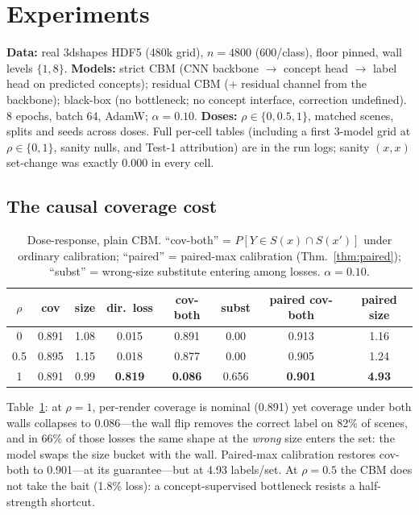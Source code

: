 \documentclass[11pt]{article}
\begin{document}
\section{Experiments}
\label{sec:experiments}

\textbf{Data:} real 3dshapes HDF5 (480k grid), $n=4800$ (600/class), floor
pinned, wall levels $\{1,8\}$. \textbf{Models:} strict CBM (CNN backbone
$\to$ concept head $\to$ label head on predicted concepts); residual CBM
(+ residual channel from the backbone); black-box (no bottleneck; no concept
interface, correction undefined). 8 epochs, batch 64, AdamW; $\alpha=0.10$.
\textbf{Doses:} $\rho \in \{0, 0.5, 1\}$, matched scenes, splits and seeds
across doses. Full per-cell tables (including a first 3-model grid at
$\rho\in\{0,1\}$, sanity nulls, and Test-1 attribution) are in the run logs;
sanity $(x,x)$ set-change was exactly $0.000$ in every cell.

\subsection{The causal coverage cost}
\label{sec:results-cost}

\begin{table}[h]
\centering
\caption{Dose-response, plain CBM. ``cov-both'' = $P[Y \in S(x) \cap S(x')]$
under ordinary calibration; ``paired'' = paired-max calibration
(Thm.~\ref{thm:paired}); ``subst'' = wrong-size substitute entering among
losses. $\alpha = 0.10$.}
\label{tab:dose}
\begin{tabular}{cccccccc}
\toprule
$\rho$ & cov & size & dir.\ loss & cov-both & subst & paired cov-both & paired size \\
\midrule
0   & 0.891 & 1.08 & 0.015 & 0.891 & 0.00 & 0.913 & 1.16 \\
0.5 & 0.895 & 1.15 & 0.018 & 0.877 & 0.00 & 0.905 & 1.24 \\
1   & 0.891 & 0.99 & \textbf{0.819} & \textbf{0.086} & 0.656 & \textbf{0.901} & \textbf{4.93} \\
\bottomrule
\end{tabular}
\end{table}

Table~\ref{tab:dose}: at $\rho=1$, per-render coverage is nominal (0.891) yet
coverage under both walls collapses to 0.086---the wall flip removes the
correct label on 82\% of scenes, and in 66\% of those losses the same shape at
the \emph{wrong} size enters the set: the model swaps the size bucket with the
wall. Paired-max calibration restores cov-both to 0.901---at its
guarantee---but at 4.93 labels/set. At $\rho=0.5$ the CBM does not take the
bait (1.8\% loss): a concept-supervised bottleneck resists a half-strength
shortcut.
\end{document}
